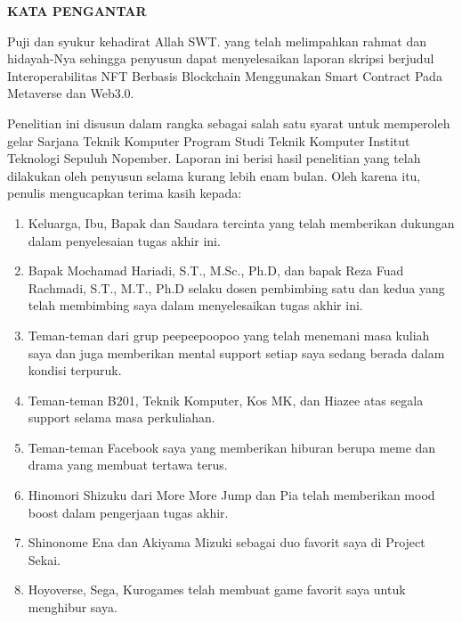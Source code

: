 \begin{center}
  \Large
  \textbf{KATA PENGANTAR}
\end{center}


\vspace{2ex}


Puji dan syukur kehadirat  Allah SWT. yang telah melimpahkan rahmat dan hidayah-Nya sehingga penyusun dapat menyelesaikan laporan skripsi berjudul Interoperabilitas NFT Berbasis Blockchain Menggunakan Smart Contract Pada Metaverse dan Web3.0.

Penelitian ini disusun dalam rangka sebagai salah satu syarat untuk memperoleh gelar Sarjana Teknik Komputer Program Studi Teknik Komputer Institut Teknologi Sepuluh Nopember. Laporan ini berisi hasil penelitian yang telah dilakukan oleh penyusun selama kurang lebih enam bulan.
Oleh karena itu, penulis mengucapkan terima kasih kepada:

\begin{enumerate}[nolistsep]

  \item Keluarga, Ibu, Bapak dan Saudara tercinta yang telah memberikan dukungan dalam penyelesaian tugas akhir ini.
  \item Bapak Mochamad Hariadi, S.T., M.Sc., Ph.D, dan bapak Reza Fuad Rachmadi, S.T., M.T., Ph.D selaku dosen pembimbing satu dan kedua yang telah membimbing saya dalam menyelesaikan tugas akhir ini.
  \item Teman-teman dari grup peepeepoopoo yang telah menemani masa kuliah saya dan juga memberikan mental support setiap saya sedang berada dalam kondisi terpuruk.
  \item Teman-teman B201, Teknik Komputer, Kos MK, dan Hiazee atas segala support selama masa perkuliahan.
  \item Teman-teman Facebook saya yang memberikan hiburan berupa meme dan drama yang membuat tertawa terus.
  \item Hinomori Shizuku dari More More Jump dan Pia telah memberikan mood boost dalam pengerjaan tugas akhir.
  \item Shinonome Ena dan Akiyama Mizuki sebagai duo favorit saya di Project Sekai.
  \item Hoyoverse, Sega, Kurogames telah membuat game favorit saya untuk menghibur saya.

\end{enumerate}

